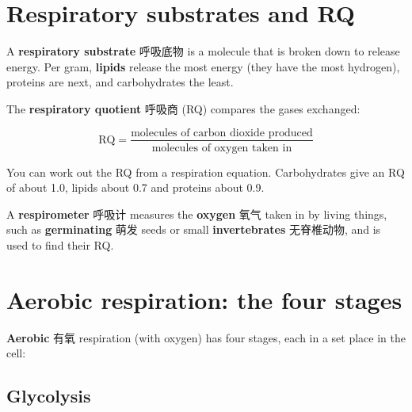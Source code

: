 \documentclass[11pt]{article}
\begin{document}
\section*{Respiratory substrates and RQ}

A \textbf{respiratory substrate} 呼吸底物 is a molecule that is broken down to release energy. Per gram, \textbf{lipids} release the most energy (they have the most hydrogen), proteins are next, and carbohydrates the least.

The \textbf{respiratory quotient} 呼吸商 (RQ) compares the gases exchanged:

\[
\text{RQ} = \frac{\text{molecules of carbon dioxide produced}}{\text{molecules of oxygen taken in}}
\]

You can work out the RQ from a respiration equation. Carbohydrates give an RQ of about 1.0, lipids about 0.7 and proteins about 0.9.

A \textbf{respirometer} 呼吸计 measures the \textbf{oxygen} 氧气 taken in by living things, such as \textbf{germinating} 萌发 seeds or small \textbf{invertebrates} 无脊椎动物, and is used to find their RQ.

\section*{Aerobic respiration: the four stages}

\textbf{Aerobic} 有氧 respiration (with oxygen) has four stages, each in a set place in the cell:

\begin{center}
\end{center}

\subsection*{Glycolysis}
\end{document}
